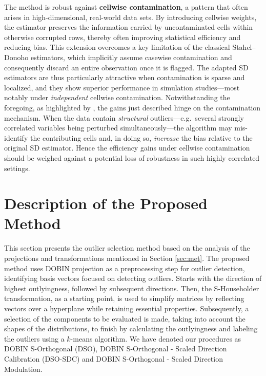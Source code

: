 \documentclass[12pt]{article}
\begin{document}
The method is robust against \textbf{cellwise contamination}, a pattern that often arises in high-dimensional, real-world data sets.  
By introducing cellwise weights, the estimator preserves the information carried by uncontaminated cells within otherwise corrupted rows, thereby often improving statistical efficiency and reducing bias.  
This extension overcomes a key limitation of the classical Stahel–Donoho estimators, which implicitly assume casewise contamination and consequently discard an entire observation once it is flagged.  
The adapted SD estimators are thus particularly attractive when contamination is sparse and localized, and they show superior performance in simulation studies—most notably under \emph{independent} cellwise contamination. Notwithstanding the foregoing, as highlighted by \citet{VanAelst2010}, the gains just described hinge on the contamination mechanism.  
When the data contain \emph{structural} outliers—e.g.\ several strongly correlated variables being perturbed simultaneously—the algorithm may mis-identify the contributing cells and, in doing so, \emph{increase} the bias relative to the original SD estimator.  
Hence the efficiency gains under cellwise contamination should be weighed against a potential loss of robustness in such highly correlated settings.



\section{Description of the Proposed Method}\label{sec:prop}

This section presents the outlier selection method based on the analysis of the projections and transformations mentioned in Section \ref{sec:met}. The proposed method uses DOBIN projection as a preprocessing step for outlier detection, identifying basis vectors focused on detecting outliers. Starts with the direction of highest outlyingness, followed by subsequent directions. Then, the S-Householder transformation, as a starting point, is used to simplify matrices by reflecting vectors over a hyperplane while retaining essential properties. Subsequently, a selection of the components to be evaluated is made, taking into account the shapes of the distributions, to finish by calculating the outlyingness and labeling the outliers using a $k$-means algorithm. We have denoted our procedures as DOBIN S-Orthogonal (DSO), DOBIN S-Orthogonal - Scaled Direction Calibration (DSO-SDC) and DOBIN S-Orthogonal - Scaled Direction Modulation.\\
\end{document}
